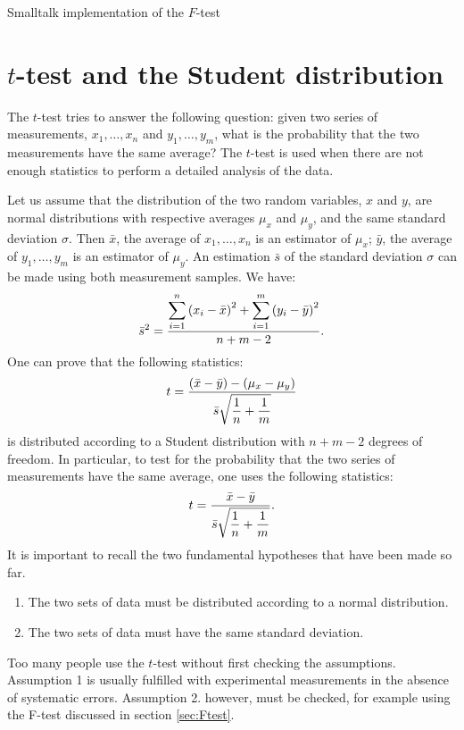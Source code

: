 \documentclass[twoside]{book}
\begin{document}
\begin{listing} Smalltalk implementation of the $F$-test \label{ls:Ftest}


\end{listing}



\section{$t$-test and the Student distribution}
\label{sec:ttest} The $t$-test tries to answer the following
question: given two series of measurements, $x_1,\ldots,x_n$ and
$y_1,\ldots,y_m$, what is the probability that the two
measurements have the same average?  The $t$-test is used when
there are not enough statistics to perform a detailed analysis of
the data.

Let us assume that the distribution of the two random variables,
$x$ and $y$, are normal distributions with respective averages
$\mu_x$ and $\mu_y$, and the same standard deviation $\sigma$.
Then $\bar{x}$, the average of $x_1,\ldots,x_n$ is an estimator of
$\mu_x$; $\bar{y}$, the average of $y_1,\ldots,y_m$ is an
estimator of $\mu_y$. An estimation $\bar{s}$ of the standard
deviation $\sigma$ can be made using both measurement samples. We
have:
\begin{equation}
\label{eq:sbart}
  \bar{s}^2={\displaystyle\sum_{i=1}^n\left(x_i-\bar{x}\right)^2
  + \sum_{i=1}^m\left(y_i-\bar{y}\right)^2\over\displaystyle n+m-2}.
\end{equation}
One can prove that the following statistics:
\begin{equation}
  t={\displaystyle \left(\bar{x}-\bar{y}\right)-\left(\mu_x
  -\mu_y\right)
  \over\displaystyle \bar{s}\sqrt{{1\over n}+{1\over m}}}
\end{equation}
is distributed according to a Student distribution with $n+m-2$
degrees of freedom. In particular, to test for the probability
that the two series of measurements have the same average, one
uses the following statistics:
\begin{equation}
\label{eq:tTest}
  t={\displaystyle \bar{x}-\bar{y}
  \over\displaystyle \bar{s}\sqrt{{1\over n}+{1\over m}}}.
\end{equation}
It is important to recall the two fundamental hypotheses that have
been made so far.
\begin{enumerate}
  \item The two sets of data must be distributed according to a normal distribution.
  \item The two sets of data must have the same standard deviation.
\end{enumerate}
Too many people use the $t$-test without first checking the
assumptions. Assumption 1 is usually fulfilled with experimental
measurements in the absence of systematic errors. Assumption 2.
however, must be checked, for example using the F-test discussed
in section \ref{sec:Ftest}.
\end{document}
